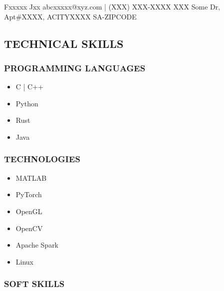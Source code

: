 \documentclass{resume}
\begin{document}
{Fxxxxx Jxx} %
{abcxxxxx@xyz.com | (XXX) XXX-XXXX} %
{XXX Some Dr, Apt\#XXXX, ACITYXXXX SA-ZIPCODE} %
\begin{flushleft}
\end{flushleft}
\begin{minipage}{0.33\linewidth} 
\subsection{TECHNICAL SKILLS}
\subsubsection{PROGRAMMING LANGUAGES}
\begin{itemize}
    \item C | C++   
    \item Python 
    \item Rust   
    \item Java 
\end{itemize}
\subsubsection{TECHNOLOGIES}
\begin{itemize}
    \item MATLAB 
    \item PyTorch 
    \item OpenGL   
    \item OpenCV 
    \item Apache Spark   
    \item Linux 
\end{itemize}
\subsubsection{SOFT SKILLS}
  \\

\end{minipage}
\end{document}
